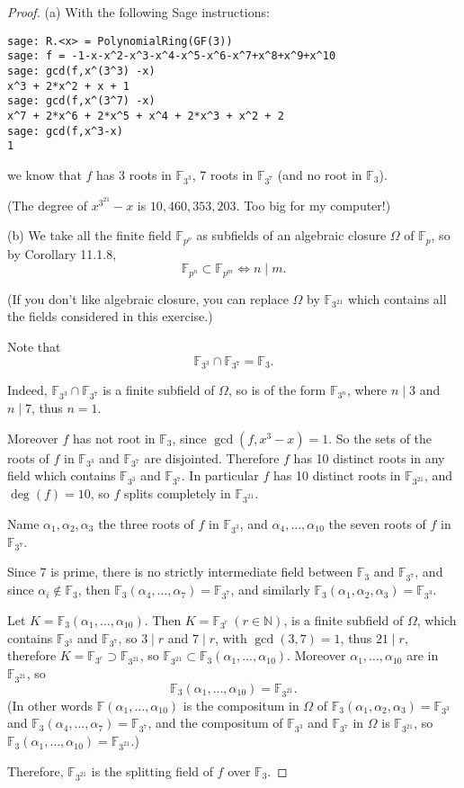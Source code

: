 \documentclass[11pt,a4paper]{article}
\newcommand{\N}{\mathbb{N}}
\newcommand{\F}{\mathbb{F}}
\begin{document}
\begin{proof}
\item[(a)]
With the following Sage instructions:
\begin{verbatim}
sage: R.<x> = PolynomialRing(GF(3))
sage: f = -1-x-x^2-x^3-x^4-x^5-x^6-x^7+x^8+x^9+x^10
sage: gcd(f,x^(3^3) -x)
x^3 + 2*x^2 + x + 1
sage: gcd(f,x^(3^7) -x)
x^7 + 2*x^6 + 2*x^5 + x^4 + 2*x^3 + x^2 + 2
sage: gcd(f,x^3-x)
1
\end{verbatim}
we know that $f$ has 3 roots in $\F_{3^3}$, 7 roots in $\F_{3^7}$ (and no root in $\F_3$).

(The degree of $x^{3^{21}} -x$ is $10,460,353,203$. Too big for my computer!)

\item[(b)] We take all the finite field $\F_{p^\nu}$ as subfields of an algebraic closure $\Omega$ of $\F_p$, so by Corollary 11.1.8,
$$\F_{p^n} \subset \F_{p^m} \iff n \mid m.$$

(If you don't like algebraic closure, you  can replace $\Omega$ by $\F_{3^{21}}$ which contains all the fields considered in this exercise.)

Note that $$\F_{3^3} \cap \F_{3^7} = \F_3.$$

Indeed, $\F_{3^3} \cap \F_{3^7}$ is a finite subfield of $\Omega$, so is of the form $\F_{3^n}$, where $n \mid 3$ and $n \mid 7$, thus $n=1$.

Moreover $f$ has not root in $\F_3$, since $\gcd(f,x^3-x)=1$. So the sets of the roots of $f$ in $\F_{3^3} $ and $ \F_{3^7}$ are disjointed. Therefore $f$ has 10 distinct roots in any field which contains  $\F_{3^3} $ and $ \F_{3^7}$. In particular $f$ has 10 distinct roots in $\F_{3^{21}}$, and $\deg(f) = 10$, so $f$ splits completely in $\F_{3^{21}}$.

Name $\alpha_1,\alpha_2,\alpha_3$ the three roots of $f$ in $\F_{3^3}$, and $\alpha_4,\ldots,\alpha_{10}$ the seven roots of $f$ in $\F_{3^7}$.

Since 7 is prime, there is no strictly intermediate field between $\F_3$ and $\F_{3^7}$, and since $\alpha_i \not \in \F_3$, then $\F_3(\alpha_4, \ldots,\alpha_7) = \F_{3^7}$, and similarly $\F_3(\alpha_1,\alpha_2,\alpha_3) = \F_{3^3}$.

Let $K = \F_3(\alpha_1,\ldots,\alpha_{10})$. Then $K = \F_{3^r}\ (r \in \N)$, is a finite subfield of $\Omega$, which contains $\F_{3^3}$ and $\F_{3^7}$, so $3 \mid r$ and $7 \mid r$, with $\gcd(3,7)=1$, thus $21 \mid r$, therefore $K = \F_{3^r} \supset \F_{3^{21}}$, so $\F_{3^{21}} \subset \F_3(\alpha_1,\ldots,\alpha_{10})$. Moreover $\alpha_1,\ldots,\alpha_{10}$ are in $\F_{3^{21}}$, so
$$\F_3(\alpha_1,\ldots,\alpha_{10} )= \F_{3^{21}}.$$
(In other words $\F(\alpha_1,\ldots,\alpha_{10})$ is the compositum in $\Omega$ of $ \F_3(\alpha_1,\alpha_2,\alpha_3) = \F_{3^3}$ and $\F_3(\alpha_4, \ldots,\alpha_7) = \F_{3^7}$, and the  
 compositum of $\F_{3^3}$ and $\F_{3^7}$ in $\Omega$ is $\F_{3^{21}}$, so $\F_3(\alpha_1,\ldots,\alpha_{10} )= \F_{3^{21}}$.)

Therefore,  $\F_{3^{21}}$ is the splitting field of $f$ over $\F_3$.
\end{proof}
\end{document}
